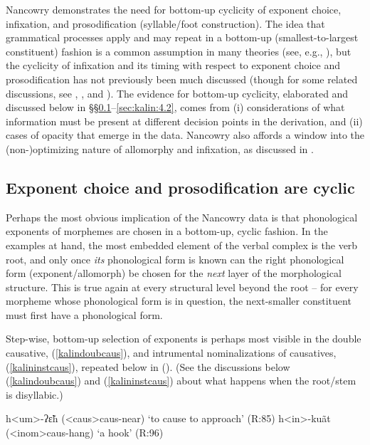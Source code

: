 \documentclass[output=paper]{langscibook}
\newcounter{nexttmp}    %
\newcommand{\Next}{\setcounter{nexttmp}{\value{equation}}\stepcounter{nexttmp}(\thenexttmp)\xspace}
\begin{document}
Nancowry demonstrates the need for bottom-up cyclicity of exponent choice, infixation, and prosodification (syllable/foot construction). The idea that grammatical processes apply and may repeat in a bottom-up (smallest-to-largest constituent) fashion is a common assumption in many theories (see, e.g., \citealt{ChomskyHalle68,Kiparsky82,Kiparsky00,Carstairs87,Anderson92,Bobaljik00,Wolf08,Embick10,BS12}), but the cyclicity of infixation and its timing with respect to exponent choice and prosodification has not previously been  much discussed (though for some related discussions, see  \citealt[\S3.4.3]{Embick10}, \citealt{BF16}, and \citealt{Harizanov17}). The evidence for bottom-up cyclicity, elaborated and discussed below in \S\S\ref{sec:kalin:4.1}--\ref{sec:kalin:4.2}, comes from (i) considerations of what information must be present at different decision points in the derivation, and (ii) cases of opacity that emerge in the data. Nancowry also affords a window into the (non-)optimizing nature of allomorphy and infixation, as discussed in .

\subsection{Exponent choice and prosodification are cyclic}\label{sec:kalin:4.1}

Perhaps the most obvious implication of the Nancowry data is that phonological exponents of morphemes are chosen in a bottom-up, cyclic fashion. In the examples at hand, the most embedded element of the verbal complex is the verb root, and only once {\it its} phonological form is known can the right phonological form (exponent/allomorph) be chosen for the {\it next} layer of the morphological structure. This is true again at every structural level beyond the root -- for every morpheme whose phonological form is in question, the next-smaller constituent must first have a phonological form. 

Step-wise, bottom-up selection of exponents is perhaps most visible in the double causative, (\ref{kalindoubcaus}), and intrumental nominalizations of causatives, (\ref{kalininstcaus}), repeated below in \Next. (See the  discussions below (\ref{kalindoubcaus}) and  (\ref{kalininstcaus}) about what happens when the root/stem is disyllabic.)

\ea \label{kalin16}
\ea h<um>-ʔ\~εh ({\sc <caus>}{\sc caus-}near) \hfill  `to cause to approach'  (R:85)\label{kalin16a}
\ex h<in>-ku\~at  ({\sc <inom>}{\sc caus-}hang) \hfill `a hook' (R:96) \label{kalin16b}
\z
\z
\end{document}
